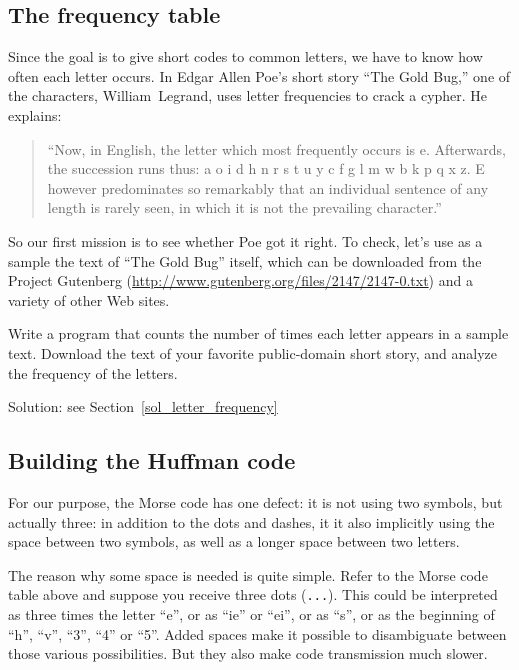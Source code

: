 \subsection{The frequency table}

Since the goal is to give short codes to common letters, we 
have to know how often each letter occurs. In Edgar Allen Poe’s 
short story ``The Gold Bug,'' one of the characters, William~Legrand, 
uses letter frequencies to crack a cypher. He explains:

\begin{quote}
``Now, in English, the letter which most frequently occurs 
is e. Afterwards, the succession runs thus: a o i d h n r s 
t u y c f g l m w b k p q x z. E however predominates so 
remarkably that an individual sentence of any length is 
rarely seen, in which it is not the prevailing character.''
\end{quote}

So our first mission is to see whether Poe got it right. 
To check, let's use as a sample the text of ``The Gold Bug'' 
itself, which can be downloaded from the Project Gutenberg 
(\url{http://www.gutenberg.org/files/2147/2147-0.txt}) and 
a variety of other Web sites. 

\begin{exercise}
\label{letter_frequency}
Write a program that counts the number of times each letter 
appears in a sample text. Download the text of your favorite 
public-domain short story, and analyze the frequency of 
the letters.

Solution: see Section~\ref{sol_letter_frequency}
\end{exercise}

\subsection{Building the Huffman code}

For our purpose, the Morse code has one defect: it is not using  
two symbols, but actually three: in addition to the dots and 
dashes, it it also implicitly using the space between two symbols, 
as well as a longer space between two letters.

The reason why some space is needed is quite simple. Refer to the Morse 
code table above and suppose you receive three dots (\verb'...'). 
This could be interpreted as three times the letter ``e'', or as 
``ie'' or ``ei'', or as ``s'', or as the beginning of ``h'', ``v'', 
``3'', ``4'' or ``5''. Added spaces make it possible to disambiguate 
between those various possibilities. But they also make code 
transmission much slower.

